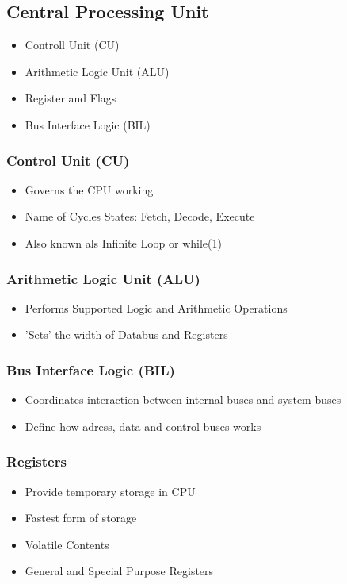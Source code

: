\subsection{Central Processing Unit }
\begin{multicols}{2}
\begin{minipage}{\linewidth}
	\begin{itemize}
		\item Controll Unit (\acs{CU})
		\item Arithmetic Logic Unit (\acs{ALU})
		\item Register and Flags
		\item Bus Interface Logic (\acs{BIL})
	\end{itemize}
\end{minipage}

	\subsubsection{Control Unit (\acs{CU})}   
		\begin{itemize}
			\item Governs the CPU working
			\item Name of Cycles States: Fetch, Decode, Execute
			\item Also known als Infinite Loop or while(1)
		\end{itemize}	
	\subsubsection{Arithmetic Logic Unit (\acs{ALU})}
	\begin{itemize}
		\item Performs Supported Logic and Arithmetic Operations
		\item 'Sets' the width of Databus and Registers
	\end{itemize}	
	\subsubsection{Bus Interface Logic (\acs{BIL})}
	\begin{itemize}
		\item Coordinates interaction between internal buses and system buses
		\item Define how adress, data and control buses works
	\end{itemize}	
	\subsubsection{Registers}
	\begin{itemize}
		\item Provide temporary storage in \acs{CPU}
		\item Fastest form of storage
		\item Volatile Contents
		\item General and Special Purpose Registers
	\end{itemize}


\end{multicols}
